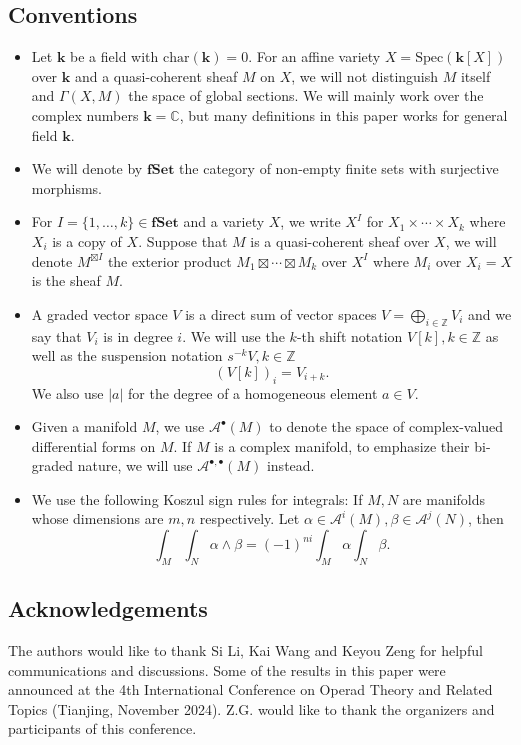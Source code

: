 \documentclass[11pt]{amsart}
\theoremstyle{definition}
\theoremstyle{remark}
\numberwithin{equation}{section}
\newcommand{\CC}{\mathbb{C}}
\newcommand{\bu}{\bullet}
\begin{document}
\subsection*{Conventions}
\begin{itemize}

  \item Let $\mathbf{k}$ be a field with $\mathrm{char}(\mathbf{k})=0$.  %
        For an affine variety $X=\mathrm{Spec}(\mathbf{k}[X])$ over $\mathbf{k}$ and a quasi-coherent sheaf $M$ on $X$, we will not distinguish $M$ itself and $\Gamma(X,M)$ the space of global sections. We will mainly work over the complex numbers $\mathbf{k} = \CC$, but many definitions in this paper works for general field $\mathbf{k}.$

       
\item We will denote by $\mathbf{fSet}$ the category of non-empty finite sets with surjective morphisms.
\item For ${I}=\{1,\dots,k\}\in {\mathbf{fSet}}$ and a variety $X$, we write $X^{{I}}$ for $X_1\times \cdots \times X_k$ where $X_i$ is a copy of $X$. Suppose that $M$ is a quasi-coherent sheaf over $X$, we will denote $M^{\boxtimes{I}}$ the exterior product $M_1\boxtimes \cdots \boxtimes M_k$ over $X^{{I}}$ where $M_i$ over $X_i=X$ is the sheaf $M$.
  \item A graded vector space $V$ is a direct sum of vector spaces $V=\mathop{\bigoplus}\limits_{i\in\mathbb{Z}}V_i$ and we say that $V_{i}$ is in degree $i$.
        We will use the $k$-th shift notation $V[k],k\in \mathbb{Z}$ as well as the suspension notation $s^{-k}V,k\in\mathbb{Z}$
$$
(V[k])_i=V_{i+k}.$$
We also use $|a|$ for the degree of a homogeneous element $a\in V.$
\item Given a manifold $M$, we use $\mathcal{A}^{\bu}(M)$ to denote the space
        of complex-valued differential forms on $M$.
        If $M$ is a
    complex manifold, to emphasize their bi-graded nature, we will use
    $\mathcal{A}^{\bu,\bu} (M)$ instead.
\item We use the following Koszul sign rules for integrals: If $M, N$ are manifolds whose dimensions are $m, n$ respectively. Let $\alpha \in \mathcal{A}^{i}(M),     \beta \in \mathcal{A}^{j}(N)$, then
$$
\int_M \int_N \alpha \wedge\beta = (- 1)^{n i} \int_M \alpha \int_N \beta .
$$
\end{itemize}
\subsection*{Acknowledgements} The authors would like to thank Si Li, Kai Wang and Keyou Zeng for helpful communications and discussions. Some of the results in this paper were announced at the 4th International Conference on Operad Theory and Related Topics (Tianjing, November 2024). Z.G. would like to thank the organizers and participants of this conference.
\end{document}
